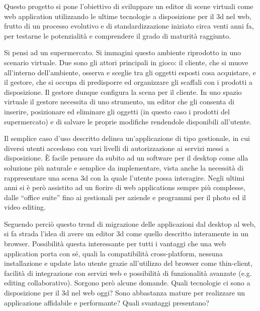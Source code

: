 Questo progetto si pone l'obiettivo di sviluppare un editor di scene virtuali come  web application utilizzando le ultime tecnologie a disposizione per il 3d nel web, frutto di un processo evolutivo e di standardizzazione iniziato circa venti anni fa, per testarne le potenzialità e comprendere il grado di maturità raggiunto.

Si pensi ad un supermercato. Si immagini questo ambiente riprodotto in uno scenario virtuale. Due sono gli attori principali in gioco: il cliente, che si muove all'interno dell'ambiente, osserva e sceglie tra gli oggetti esposti cosa acquistare, e il gestore, che si occupa di predisporre ed organizzare gli scaffali con i prodotti a disposizione. Il gestore dunque configura la scena per il cliente. In uno spazio virtuale il gestore necessita di uno strumento, un editor che gli consenta di inserire, posizionare ed eliminare gli oggetti (in questo caso i prodotti del supermercato) e di salvare le proprie modifiche rendendole disponibili all'utente.

Il semplice caso d'uso descritto delinea un'applicazione di tipo gestionale, in cui diversi utenti accedono con vari livelli di autorizzazione ai servizi messi a disposizione. È facile pensare da subito ad un software per il desktop come alla soluzione più naturale e semplice da implementare, vista anche la necessità di rappresentare una scena 3d con la quale l'utente possa interagire. Negli ultimi anni si è però assistito ad un fiorire di web applications sempre più complesse, dalle “office suite” fino ai gestionali per aziende e programmi per il photo ed il video editing.

Seguendo perciò questo trend di migrazione delle applicazioni dal desktop al web, si fa strada l'idea di avere un editor 3d come quello descritto interamente in un browser. Possibilità questa interessante per tutti i vantaggi che una web application porta con s\'{e}, quali la compatibilità cross-platform, nessuna installazione e update lato utente grazie all'utilizzo del browser come thin-client, facilità di integrazione con servizi web e possibilità di funzionalità avanzate (e.g. editing collaborativo). Sorgono però alcune domande. Quali tecnologie ci sono a disposizione per il 3d nel web oggi? Sono abbastanza mature per realizzare un applicazione affidabile e performante? Quali svantaggi presentano? 


